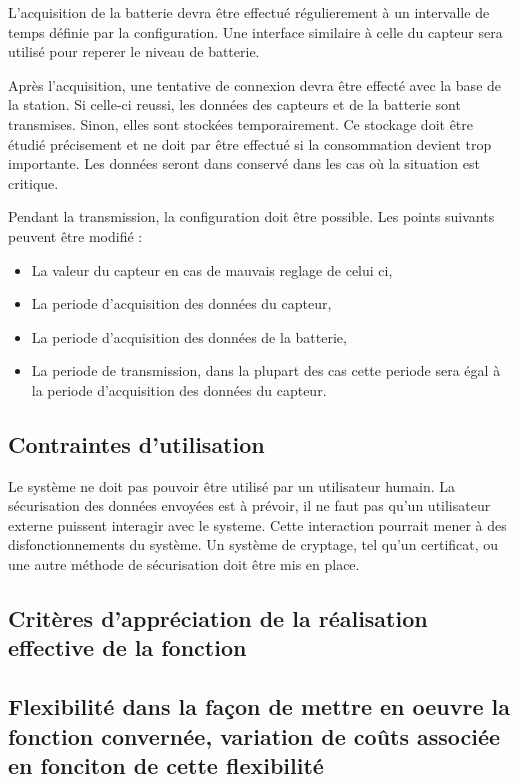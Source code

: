 L'acquisition de la batterie devra être effectué régulierement à un intervalle de temps définie par la configuration. Une interface similaire à celle du capteur sera utilisé pour reperer le niveau de batterie.

Après l'acquisition, une tentative de connexion devra être effecté avec la base de la station. Si celle-ci reussi, les données des capteurs et de la batterie sont transmises. Sinon, elles sont stockées temporairement. Ce stockage doit être étudié précisement et ne doit par être effectué si la consommation devient trop importante. Les données seront dans conservé dans les cas où la situation est critique.  

Pendant la transmission, la configuration doit être possible. Les points suivants peuvent être modifié :
\begin{itemize}
\item La valeur du capteur en cas de mauvais reglage de celui ci,
\item La periode d'acquisition des données du capteur,
\item La periode d'acquisition des données de la batterie,
\item La periode de transmission, dans la plupart des cas cette periode sera égal à la periode d'acquisition des données du capteur. 
\end{itemize}

\subsection{Contraintes d'utilisation}

Le système ne doit pas pouvoir être utilisé par un utilisateur humain. La sécurisation des données envoyées est à prévoir, il ne faut pas qu'un utilisateur externe puissent interagir avec le systeme. Cette interaction pourrait mener à des disfonctionnements du système. Un système de cryptage, tel qu'un certificat, ou une autre méthode de sécurisation doit être mis en place.

\subsection{Critères d'appréciation de la réalisation effective de la fonction}
\subsection{Flexibilité dans la façon de mettre en oeuvre la fonction convernée, variation de coûts associée en fonciton de cette flexibilité}

